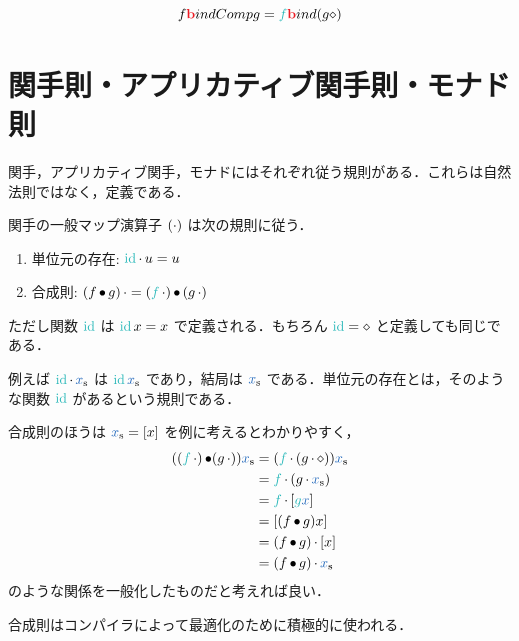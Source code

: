 \documentclass[a5paper,twoside,fleqn,draft]{jsbook}
\begin{document}
\separator

\begin{equation}
  f\hTypeName{b}indComp g
  =\hFunc{f}\hTypeName{b}ind(g\hAnonParam)
\end{equation}


\section{関手則・アプリカティブ関手則・モナド則}

関手，アプリカティブ関手，モナドにはそれぞれ従う規則がある．これらは自然法則ではなく，定義である．

関手の一般マップ演算子 $(\operatorname{\cdot})$ は次の規則に従う．
\begin{enumerate}
\item 単位元の存在: $\mId\mMap u=u$
\item 合成則: $(f\hCompose g)\mMap=(\hFunc{f}\mMap)\hCompose{}(g\mMap)$%
\end{enumerate}
ただし関数 $\mId$ は $\mId x=x$ で定義される．もちろん $\mId=\hAnonParam$ と定義しても同じである．


例えば $\mId\mMap\hListVar{x}$ は $\mId\hListVar{x}$ であり，結局は $\hListVar{x}$ である．単位元の存在とは，そのような関数 $\mId$ があるという規則である．

合成則のほうは $\hListVar{x}=[x]$ を例に考えるとわかりやすく，
\begin{align}
  ((\hFunc{f}\mMap)\hCompose(g\mMap))\hListVar{x}
  &=(\hFunc{f}\mMap{}(g\mMap\hAnonParam))\hListVar{x}\\
  &=\hFunc{f}\mMap{}(g\mMap\hListVar{x})\\
  &=\hFunc{f}\mMap{}[\hFunc{g}\hVar{x}]\\
  &=[(f\hCompose g)x]\\
  &=(f\hCompose g)\mMap{}[x]\\
  &=(f\hCompose g)\mMap\hListVar{x}
\end{align}
のような関係を一般化したものだと考えれば良い．

合成則は\haskell コンパイラによって最適化のために積極的に使われる．

\separator
\end{document}
